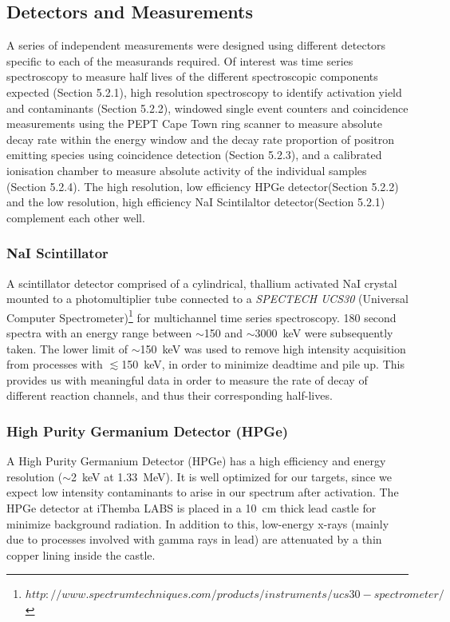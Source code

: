 \documentclass[]{article}
\begin{document}
\subsection{Detectors and Measurements}\label{measurments section}
A series of independent measurements were designed using different detectors specific to each of the measurands required. Of interest was time series spectroscopy to measure half lives of the different spectroscopic components expected (Section 5.2.1), high resolution spectroscopy to identify activation yield and contaminants (Section 5.2.2), windowed single event counters and coincidence measurements using the PEPT Cape Town ring scanner to measure absolute decay rate within the energy window and the decay rate proportion of positron emitting species using coincidence detection (Section 5.2.3), and a calibrated ionisation chamber to measure absolute activity of the individual samples (Section 5.2.4). The high resolution, low efficiency HPGe detector(Section 5.2.2) and the low resolution, high efficiency NaI Scintilaltor detector(Section 5.2.1) complement each other well.

\subsubsection{NaI Scintillator}
A scintillator detector comprised of a cylindrical, thallium activated NaI crystal mounted to a photomultiplier tube connected to a \textit{SPECTECH UCS30} (Universal Computer Spectrometer)\footnote{$http://www.spectrumtechniques.com/products/instruments/ucs30-spectrometer/$} for multichannel time series spectroscopy. 180 second spectra with an energy range between $\sim$150 and $\sim$\SI{3000}{\kilo \electronvolt} were subsequently taken. The lower limit of $\sim$\SI{150}{\kilo \electronvolt} was used to remove high intensity acquisition from processes with $\lesssim$\SI{150}{\kilo \electronvolt}, in order to minimize deadtime and pile up. This provides us with meaningful data in order to measure the rate of decay of different reaction channels, and thus their corresponding half-lives.
\subsubsection{High Purity Germanium Detector (HPGe)}
A High Purity Germanium Detector (HPGe) has a high efficiency and energy resolution ($\sim$\SI{2}{\kilo \electronvolt} at \SI{1.33}{\mega \electronvolt}\cite{hpgeinfo}). It is well optimized for our targets, since we expect low intensity contaminants to arise in our spectrum after activation. The HPGe detector at iThemba LABS is placed in a \SI{10}{\centi \metre} thick lead castle for minimize background radiation. In addition to this, low-energy x-rays (mainly due to processes involved with gamma rays in lead) are attenuated by a thin copper lining inside the castle.
 
\end{document}
